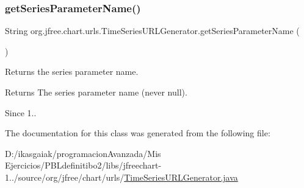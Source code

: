 \subsubsection{\texorpdfstring{get\+Series\+Parameter\+Name()}{getSeriesParameterName()}}
{\footnotesize\ttfamily String org.\+jfree.\+chart.\+urls.\+Time\+Series\+U\+R\+L\+Generator.\+get\+Series\+Parameter\+Name (\begin{DoxyParamCaption}{ }\end{DoxyParamCaption})}

Returns the series parameter name.

\begin{DoxyReturn}{Returns}
The series parameter name (never {\ttfamily null}).
\end{DoxyReturn}
\begin{DoxySince}{Since}
1.. 
\end{DoxySince}


The documentation for this class was generated from the following file\+:\begin{DoxyCompactItemize}
\item 
D\+:/ikasgaiak/programacion\+Avanzada/\+Mis Ejercicios/\+P\+B\+Ldefinitibo2/libs/jfreechart-\/1../source/org/jfree/chart/urls/\mbox{\hyperlink{_time_series_u_r_l_generator_8java}{Time\+Series\+U\+R\+L\+Generator.\+java}}\end{DoxyCompactItemize}
